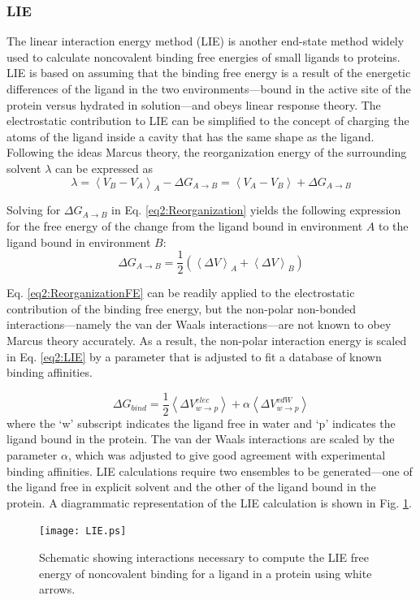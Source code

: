\subsubsection{LIE}

The linear interaction energy method (LIE) is another end-state method widely
used to calculate noncovalent binding free energies of small ligands to
proteins. LIE is based on assuming that the binding free energy is a result of
the energetic differences of the ligand in the two environments---bound in the
active site of the protein versus hydrated in solution---and obeys linear
response theory. \cite{Aqvist_ProteinEng_1994_v7_p385} The electrostatic
contribution to LIE can be simplified to the concept of charging the atoms of
the ligand inside a cavity that has the same shape as the ligand. Following the
ideas Marcus theory, \cite{Marcus1955} the reorganization energy of the
surrounding solvent $\lambda$ can be expressed as
\cite{Aqvist_ProteinEng_1994_v7_p385}
\begin{equation}
   \lambda = \left \langle V_B - V_A \right \rangle _ A - \Delta G _ {A
         \rightarrow B} = \left \langle V _ A - V _ B \right \rangle + \Delta G
         _ {A \rightarrow B}
   \label{eq2:Reorganization}
\end{equation}

Solving for $\Delta G _ {A \rightarrow B}$ in Eq. \ref{eq2:Reorganization}
yields the following expression for the free energy of the change from the
ligand bound in environment $A$ to the ligand bound in environment $B$:
\begin{equation}
   \Delta G _ {A \rightarrow B} = \frac 1 2 \left( \left \langle \Delta V
      \right \rangle _ A + \left \langle \Delta V \right \rangle _ B \right)
   \label{eq2:ReorganizationFE}
\end{equation}

Eq. \ref{eq2:ReorganizationFE} can be readily applied to the electrostatic
contribution of the binding free energy, but the non-polar non-bonded
interactions---namely the van der Waals interactions---are not known to obey
Marcus theory accurately. As a result, the non-polar interaction energy is
scaled in Eq. \ref{eq2:LIE} by a parameter that is adjusted to fit a database of
known binding affinities. \cite{Aqvist_ProteinEng_1994_v7_p385}

\begin{equation}
   \Delta G_{bind} = \frac 1 2 \left \langle \Delta V_{w \rightarrow p} ^{elec}
         \right \rangle + \alpha \left \langle \Delta V_{w \rightarrow p} ^{vdW}
         \right \rangle
   \label{eq2:LIE}
\end{equation}
where the `w' subscript indicates the ligand free in water and `p' indicates the
ligand bound in the protein. The van der Waals interactions are scaled by the
parameter $\alpha$, which was adjusted to give good agreement with experimental
binding affinities. LIE calculations require two ensembles to be generated---one
of the ligand free in explicit solvent and the other of the ligand bound in the
protein. A diagrammatic representation of the LIE calculation is shown in Fig.
\ref{fig2:LIE}.

\begin{figure}
   \texttt{[image: LIE.ps]}
   \caption{Schematic showing interactions necessary to compute the LIE free
            energy of noncovalent binding for a ligand in a protein using white
            arrows.}
   \label{fig2:LIE}
\end{figure}
